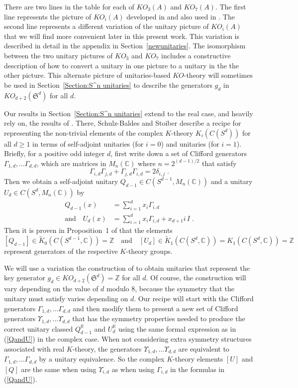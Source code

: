 \documentclass[12pt, reqno]{amsart}
\theoremstyle{definition}
\def\R{{\mathbb R}}
\def\C{{\mathbb C}}
\def\Z{{\mathbb Z}}
\def\Up{{\Upsilon}}
\def\pr{^{\scriptscriptstyle \R}}
\newcommand{\fS}{\mathfrak S}
\begin{document}
There are two lines in the table for each of $KO_{3}(A)$ and $KO_7(A)$. The first line represents the picture of $KO_i(A)$ developed in \cite{BL} and also used in \cite{Boer2020}. The second line represents a different variation of the unitary picture of $KO_i(A)$ that we will find more convenient later in this present work.
This variation is described in detail in the appendix in Section~\ref{newunitaries}. The isomorphism between the two unitary pictures of $KO_3$ and $KO_7$ includes a constructive description of how to convert a unitary in one picture to a unitary in the the other picture. This alternate picture of unitaries-based $KO$-theory will sometimes be used in Section~\ref{Section:S^n unitaries} to describe the generators $g_d$ in $KO_{d+2}(\fS^d)$ for all $d$.

Our results in Section~\ref{Section:S^n unitaries}  extend to the real case, and heavily rely on, the results of \cite{SBS}. 
There, Schulz-Baldes and Stoiber describe a recipe for representing the non-trivial elements of the complex $K$-theory $K_i(C(S^d))$ for all $d \geq 1$ in terms of self-adjoint unitaries (for $i = 0$) and unitaries (for $i = 1$).
 Briefly, for a positive odd integer $d$, first write down a set of Clifford generators $\Gamma_{1, d}, \dots \Gamma_{d,d}$, which are matrices in $M_{n}(\C)$ where
 $n = 2^{(d-1)/2}$ that satisfy 
 $$\Gamma_{i, d} \Gamma_{j,d} +  \Gamma_{j, d} \Gamma_{i,d}  = 2 \delta_{i,j} \; .$$
  Then we obtain a self-adjoint unitary $Q_{d-1} \in C(S^{d-1}, M_n(\C))$ and a unitary $U_d \in C(S^{d}, M_n(\C))$ by
\begin{align} \label{QandU}
	Q_{d-1}(x) &= \sum_{i=1}^{d} x_i \Gamma_{i,d} \\
	 \text{and} \quad 
	U_d(x) &= \sum_{i=1}^d x_i \Gamma_{i,d}  + x_{d+1} i \,  I   \; .  \nonumber
\end{align}
Then it is proven in Proposition~1 of \cite{SBS} that the elements
$$[Q_{d-1}] \in \widetilde{K}_0(C(S^{d-1}, \C)) = \Z \quad \text{and} \quad
[U_d] \in \widetilde{K}_1(C(S^d, \C) ) = {K}_1(C(S^d, \C) ) = \Z$$ represent generators of the respective $K$-theory groups.

We will use a variation the construction of \cite{SBS} to obtain unitaries that represent the key generator $g_d \in KO_{d+2}(\fS^d) = \Z$ for all $d$. Of course, the construction will vary depending on the value of $d$ modulo $8$, because the symmetry that the unitary must satisfy varies depending on $d$. Our recipe will start with the Clifford generators $\Gamma_{1, d}, \dots \Gamma_{d,d}$ and then modify them to present a new set of Clifford generators
$\Up_{1, d}, \dots \Up_{d,d}$ that has the symmetry properties needed to produce the correct unitary classed $Q_{d-1}\pr$ and $U_d\pr$
using the same formal expression as in (\ref{QandU}) in the complex case. When not considering extra symmetry structures associated with real $K$-theory, the generators $\Up_{1, d}, \dots \Up_{d,d}$ are equivalent to $\Gamma_{1, d}, \dots \Gamma_{d,d}$ by a unitary equivalence. So the complex $K$-theory elements $[U]$ and $[Q]$ are the same when using $\Up_{i,d}$ as when using $\Gamma_{i,d}$ in the formulas in (\ref{QandU}).
\end{document}
